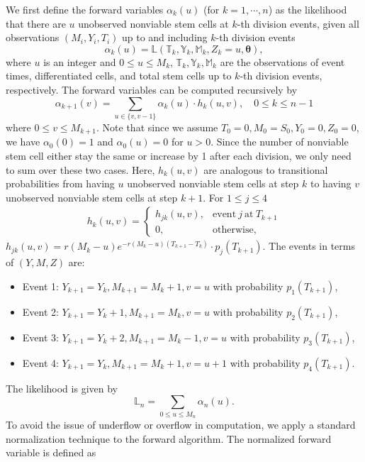 \documentclass[pdflatex,sn-mathphys-num]{sn-jnl}
\theoremstyle{thmstyleone}%
\theoremstyle{thmstyletwo}%
\theoremstyle{thmstylethree}%
\newcommand{\LL}{\mathbb{L}}
\begin{document}
We first define the forward variables $\alpha_k(u)$ (for $k = 1, \cdots, n$) as the likelihood that there are $u$ unobserved nonviable stem cells at $k$-th division events, given all observations $(M_i, Y_i, T_i)$ up to and including $k$-th division events
$$\alpha_k(u) = \LL(\mathbb{T}_k,\mathbb{Y}_k, \mathbb{M}_k, Z_k = u, \boldsymbol{\theta}),$$
where $u$ is an integer and $0 \leq u \leq M_k$, $\mathbb{T}_k, \mathbb{Y}_k, \mathbb{M}_k$ are the observations of event times, differentiated cells, and total stem cells up to $k$-th division events, respectively. The forward variables can be computed recursively by
$$\alpha_{k+1} (v) = \sum_{u \in\{v, v-1\}} \alpha_k(u) \cdot h_k(u,v), \quad 0 \leq k \leq n-1$$
where $0 \leq v \leq M_{k+1}$. Note that since we assume $T_0 = 0, M_0 = S_0, Y_0 = 0, Z_0 = 0$, we have $\alpha_0(0) = 1$ and $\alpha_0(u) = 0$ for $u >0$. Since the number of nonviable stem cell either stay the same or increase by 1 after each division, we only need to sum over these two cases. Here, $h_k(u,v)$ are analogous to transitional probabilities from having $u$ unobserved nonviable stem cells at step $k$ to having $v$ unobserved nonviable stem cells at step $k+1$. For $1 \leq j \leq 4$
\begin{equation*}
    \begin{split}
        h_k(u,v) = \begin{cases}
            h_{jk}(u,v), & \text{event}\ j \ \text{at} \ T_{k+1}\\
            0, & \text{otherwise},
        \end{cases}
    \end{split}
\end{equation*}
$h_{jk}(u,v) = r(M_k-u) e^{-r(M_k-u) (T_{k+1}-T_k)}\cdot p_j(T_{k+1})$. The events in terms of $(Y,M,Z)$ are:
\begin{itemize}
    \item Event 1: $Y_{k+1} = Y_k, M_{k+1} = M_k +1, v = u$ with probability $p_1(T_{k+1})$,
    \item Event 2: $Y_{k+1} = Y_k +1, M_{k+1} =M_k, v = u$ with probability $p_2(T_{k+1})$,
    \item Event 3: $Y_{k+1} = Y_k +2, M_{k+1} = M_k -1, v = u$ with probability $p_3(T_{k+1})$,
    \item Event 4: $Y_{k+1} = Y_k, M_{k+1} = M_k + 1, v = u+1$ with probability $p_4(T_{k+1})$.
\end{itemize}
The likelihood is given by $$\LL_n = \sum_{0 \leq u \leq M_n} \alpha_n(u).$$
To avoid the issue of underflow or overflow in computation, we apply a standard normalization technique to the forward algorithm. The normalized forward variable is defined as
\end{document}
